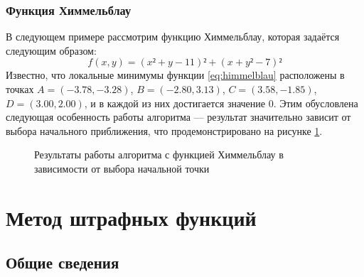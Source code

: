 \documentclass{article}
\theoremstyle{remark}
\theoremstyle{definition}
\numberwithin{equation}{section}
\begin{document}
\subsubsection{Функция Химмельблау}

В следующем примере рассмотрим функцию Химмельблау, которая задаётся
следующим образом:
\begin{equation}
  \label{eq:himmelblau}
  f(x, y) = (x² + y - 11)² + (x + y² - 7)²
\end{equation}
Известно, что локальные минимумы функции \eqref{eq:himmelblau}
расположены в точках $A=(-3.78, -3.28)$, $B=(-2.80, 3.13)$, $C=(3.58,
-1.85)$, $D=(3.00, 2.00)$, и в каждой из них достигается значение $0$.
Этим обусловлена следующая особенность работы алгоритма — результат
значительно зависит от выбора начального приближения, что
продемонстрировано на рисунке \ref{fig:himmelblau}.

\begin{figure}[!thb]
  \centering
  \caption{Результаты работы алгоритма с функцией Химмельблау в
    зависимости от выбора начальной точки}
  \label{fig:himmelblau}
\end{figure}

\clearpage
\section{Метод штрафных функций}

\subsection{Общие сведения}
\end{document}
